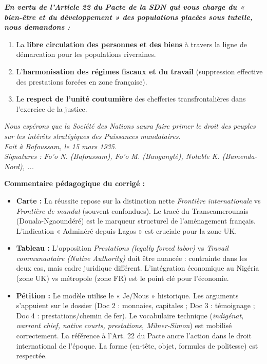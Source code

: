 \documentclass[11pt]{article}
\begin{document}
\begin{exoresolu}
\emph{\textbf{En vertu de l'Article 22 du Pacte de la SDN qui vous charge du « bien-être et du développement » des populations placées sous tutelle, nous demandons :}}
\begin{enumerate}
    \item La \textbf{libre circulation des personnes et des biens} à travers la ligne de démarcation pour les populations riveraines.
    \item L'\textbf{harmonisation des régimes fiscaux et du travail} (suppression effective des prestations forcées en zone française).
    \item Le \textbf{respect de l'unité coutumière} des chefferies transfrontalières dans l'exercice de la justice.
\end{enumerate}
\emph{Nous espérons que la Société des Nations saura faire primer le droit des peuples sur les intérêts stratégiques des Puissances mandataires.}\\[0.5cm]
\textit{Fait à Bafoussam, le 15 mars 1935.}\\
\textit{Signatures : Fo'o N. (Bafoussam), Fo'o M. (Bangangté), Notable K. (Bamenda-Nord), ...}

\medskip
\noindent \textbf{Commentaire pédagogique du corrigé :}
\begin{itemize}
    \item \textbf{Carte :} La réussite repose sur la distinction nette \emph{Frontière internationale} vs \emph{Frontière de mandat} (souvent confondues). Le tracé du Transcamerounais (Douala-Ngaoundéré) est le marqueur structurel de l'aménagement français. L'indication « Adminéré depuis Lagos » est cruciale pour la zone UK.
    \item \textbf{Tableau :} L'opposition \emph{Prestations (legally forced labor)} vs \emph{Travail communautaire (Native Authority)} doit être nuancée : contrainte dans les deux cas, mais cadre juridique différent. L'intégration économique au Nigéria (zone UK) vs métropole (zone FR) est le point clé pour l'économie.
    \item \textbf{Pétition :} Le modèle utilise le « Je/Nous » historique. Les arguments s'appuient sur le dossier (Doc 2 : monnaies, capitales ; Doc 3 : témoignage ; Doc 4 : prestations/chemin de fer). Le vocabulaire technique (\emph{indigénat, warrant chief, native courts, prestations, Milner-Simon}) est mobilisé correctement. La référence à l'Art. 22 du Pacte ancre l'action dans le droit international de l'époque. La forme (en-tête, objet, formules de politesse) est respectée.
\end{itemize}
\end{exoresolu}
\end{document}
